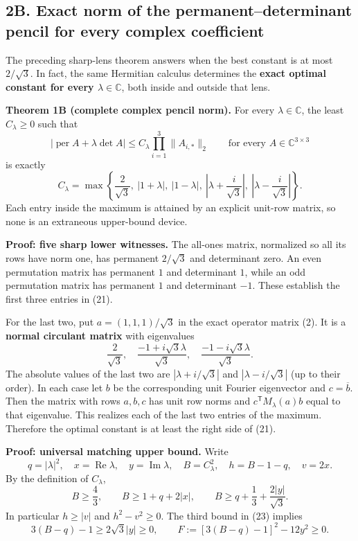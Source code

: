 \documentclass[
  11pt,
]{article}
\begin{document}
\subsection{2B. Exact norm of the permanent--determinant pencil for
every complex
coefficient}\label{b.-exact-norm-of-the-permanentdeterminant-pencil-for-every-complex-coefficient}

The preceding sharp-lens theorem answers when the best constant is at
most \(2/\sqrt3\). In fact, the same Hermitian calculus determines the
\textbf{exact optimal constant for every \(\lambda\in\mathbb C\)}, both
inside and outside that lens.

\textbf{Theorem 1B (complete complex pencil norm).} For every
\(\lambda\in\mathbb C\), the least \(C_\lambda\ge0\) such that \[
|\operatorname{per}A+\lambda\det A|
\le C_\lambda\prod_{i=1}^3\|A_{i,*}\|_2
\qquad\text{for every }A\in\mathbb C^{3\times3}
\tag{20}
\] is exactly \[
\boxed{
C_\lambda=\max\left\{
\frac2{\sqrt3},\ |1+\lambda|,\ |1-\lambda|,\
\left|\lambda+\frac{i}{\sqrt3}\right|,\
\left|\lambda-\frac{i}{\sqrt3}\right|
\right\}.}
\tag{21}
\] Each entry inside the maximum is attained by an explicit unit-row
matrix, so none is an extraneous upper-bound device.

\textbf{Proof: five sharp lower witnesses.} The all-ones matrix,
normalized so all its rows have norm one, has permanent \(2/\sqrt3\) and
determinant zero. An even permutation matrix has permanent \(1\) and
determinant \(1\), while an odd permutation matrix has permanent \(1\)
and determinant \(-1\). These establish the first three entries in (21).

For the last two, put \(a=(1,1,1)/\sqrt3\) in the exact operator matrix
(2). It is a \textbf{normal circulant matrix} with eigenvalues \[
\frac2{\sqrt3},\quad
\frac{-1+i\sqrt3\lambda}{\sqrt3},\quad
\frac{-1-i\sqrt3\lambda}{\sqrt3}.
\tag{22}
\] The absolute values of the last two are \(|\lambda+i/\sqrt3|\) and
\(|\lambda-i/\sqrt3|\) (up to their order). In each case let \(b\) be
the corresponding unit Fourier eigenvector and \(c=\overline b\). Then
the matrix with rows \(a,b,c\) has unit row norms and
\(c^{\mathsf T}M_\lambda(a)b\) equal to that eigenvalue. This realizes
each of the last two entries of the maximum. Therefore the optimal
constant is at least the right side of (21).

\textbf{Proof: universal matching upper bound.} Write \[
q=|\lambda|^2,\quad x=\operatorname{Re}\lambda,\quad
y=\operatorname{Im}\lambda,\quad
B=C_\lambda^2,\quad h=B-1-q,\quad v=2x.
\] By the definition of \(C_\lambda\), \[
B\ge\frac43,\qquad
B\ge1+q+2|x|,\qquad
B\ge q+\frac13+\frac{2|y|}{\sqrt3}.
\tag{23}
\] In particular \(h\ge|v|\) and \(h^2-v^2\ge0\). The third bound in
(23) implies \[
3(B-q)-1\ge2\sqrt3|y|\ge0,
\qquad
F:=[3(B-q)-1]^2-12y^2\ge0.
\tag{24}
\]
\end{document}
